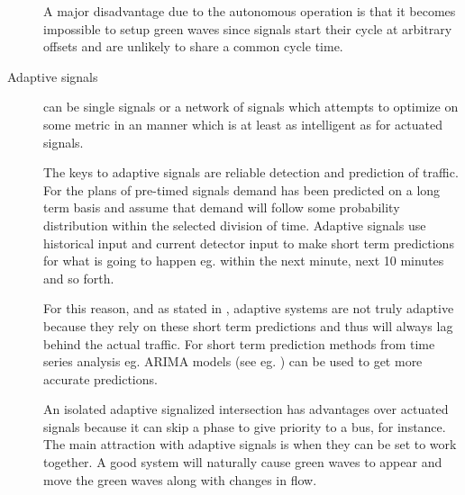\begin{description}
A major disadvantage due to the autonomous operation is that it becomes impossible to setup green waves since signals start their cycle at arbitrary offsets and are unlikely to share a common cycle time.

\item[Adaptive signals] can be single signals or a network of signals which attempts to optimize on some metric in an manner which is at least as intelligent as for actuated signals. 

The keys to adaptive signals are reliable detection and prediction of traffic. For the plans of pre-timed signals demand has been predicted on a long term basis and assume that demand will follow some probability distribution within the selected division of time. Adaptive signals use historical input and current detector input to make short term predictions for what is going to happen eg. within the next minute, next 10 minutes and so forth. 

For this reason, and as stated in \cite{1}, adaptive systems are not truly adaptive because they rely on these short term predictions and thus will always lag behind the actual traffic. For short term prediction methods from time series analysis eg. ARIMA models (see eg. \cite{shortpredict}) can be used to get more accurate predictions.

An isolated adaptive signalized intersection has advantages over actuated signals because it can skip a phase to give priority to a bus, for instance. The main attraction with adaptive signals is when they can be set to work together. A good system will naturally cause green waves to appear and move the green waves along with changes in flow.
\end{description}
